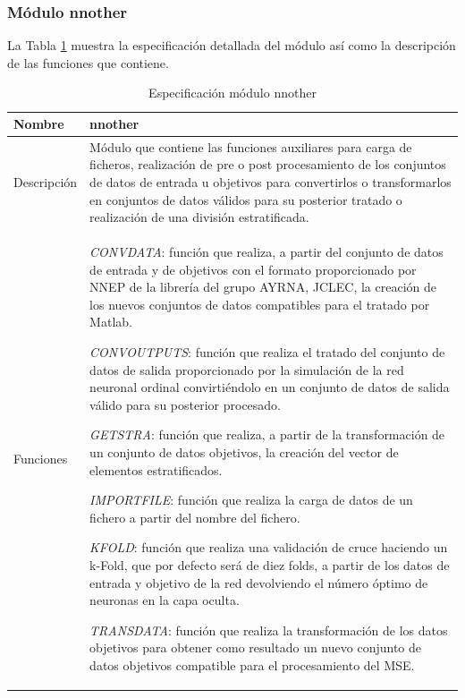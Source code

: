 			\subsubsection{Módulo nnother}
			
			La Tabla \ref{modulo_nnother} muestra la especificación detallada del módulo así como la descripción de las funciones que contiene.
			
			\begin{table}[!h]
				\centering
				\begin{tabular}{l|p{.5\linewidth}}
					\hline Nombre & nnother \\ 
					\hline Descripción & Módulo que contiene las funciones auxiliares para carga de ficheros, realización de pre o post procesamiento de los conjuntos de datos de entrada u objetivos para convertirlos o transformarlos en conjuntos de datos válidos para su posterior tratado o realización de una división estratificada. \\ 
					\hline Funciones & \textit{CONVDATA}: función que realiza, a partir del conjunto de datos de entrada y de objetivos con el formato proporcionado por NNEP de la librería del grupo AYRNA, JCLEC, la creación de los nuevos conjuntos de datos compatibles para el tratado por Matlab.
					
					\textit{CONVOUTPUTS}: función que realiza el tratado del conjunto de datos de salida proporcionado por la simulación de la red neuronal ordinal convirtiéndolo en un conjunto de datos de salida válido para su posterior procesado.
					
					\textit{GETSTRA}: función que realiza, a partir de la transformación de un conjunto de datos objetivos, la creación del vector de elementos estratificados.
					
					\textit{IMPORTFILE}: función que realiza la carga de datos de un fichero a partir del nombre del fichero.
					
					\textit{KFOLD}: función que realiza una validación de cruce haciendo un k-Fold, que por defecto será de diez folds, a partir de los datos de entrada y objetivo de la red devolviendo el número óptimo de neuronas en la capa oculta.
					
					\textit{TRANSDATA}: función que realiza la transformación de los datos objetivos para obtener como resultado un nuevo conjunto de datos objetivos compatible para el procesamiento del MSE. \\ 
					\hline 
				\end{tabular}
				\caption{Especificación módulo nnother}
				\label{modulo_nnother}
			\end{table}
			
